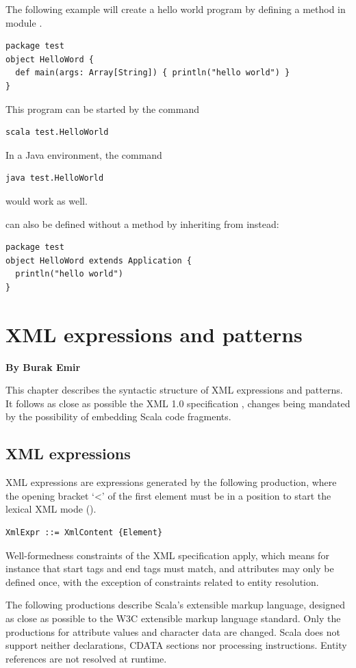 \example The following example will create a hello world program by defining
a method  in module .
\begin{lstlisting}
package test
object HelloWord {
  def main(args: Array[String]) { println("hello world") }
}
\end{lstlisting}

This program can be started by the command
\begin{lstlisting}
scala test.HelloWorld
\end{lstlisting}
In a Java environment, the command
\begin{lstlisting}
java test.HelloWorld
\end{lstlisting}
would work as well. 

 can also be defined without a  method 
by inheriting from  instead:
\begin{lstlisting}
package test 
object HelloWord extends Application {
  println("hello world")
}
\end{lstlisting}

\chapter{XML expressions and patterns}

{\bf By Burak Emir}\bigskip\bigskip


This chapter describes the syntactic structure of XML expressions and patterns.
It follows as close as possible the XML 1.0 specification \cite{w3c:xml},
changes being mandated by the possibility of embedding Scala code fragments.

\section{XML expressions}
XML expressions are expressions generated by the following production, where the 
opening bracket `<' of the first element must be in a position to start the lexical
XML mode ().

\syntax\begin{lstlisting}
XmlExpr ::= XmlContent {Element}
\end{lstlisting}
Well-formedness constraints of the XML specification apply, which
means for instance that start tags and end tags must match, and
attributes may only be defined once, with the exception of constraints
related to entity resolution.

The following productions describe Scala's extensible markup language,
designed as close as possible to the W3C extensible markup language
standard. Only the productions for attribute values and character data
are changed. Scala does not support neither declarations, CDATA
sections nor processing instructions. Entity references are not
resolved at runtime.

